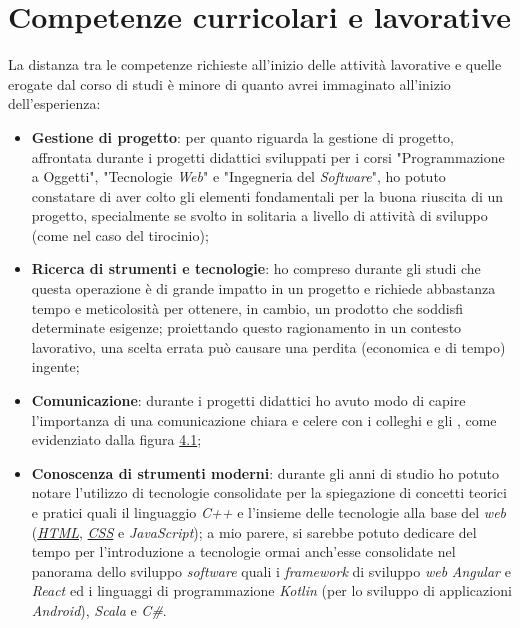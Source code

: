 \section{Competenze curricolari e lavorative}
La distanza tra le competenze richieste all'inizio delle attività lavorative e quelle erogate dal corso di studi è minore di quanto avrei immaginato all'inizio dell'esperienza: 
\begin{itemize}
    \item \textbf{Gestione di progetto}: per quanto riguarda la gestione di progetto, affrontata durante i progetti didattici sviluppati per i corsi "Programmazione a Oggetti", "Tecnologie \textit{Web}" e "Ingegneria del \textit{Software}", 
            ho potuto constatare di aver colto gli elementi fondamentali per la buona riuscita di un progetto, specialmente se svolto in solitaria a livello di attività di sviluppo (come nel caso del tirocinio);
    \item \textbf{Ricerca di strumenti e tecnologie}: ho compreso durante gli studi che questa operazione è di grande impatto in un progetto e richiede abbastanza tempo e meticolosità per ottenere, in cambio, un prodotto che soddisfi determinate esigenze; proiettando questo ragionamento in un
            contesto lavorativo, una scelta errata può causare una perdita (economica e di tempo) ingente;
    \item \textbf{Comunicazione}: durante i progetti didattici ho avuto modo di capire l'importanza di una comunicazione chiara e celere con i colleghi e gli , come evidenziato dalla figura \hyperref[fig:req]{4.1};
    \item \textbf{Conoscenza di strumenti moderni}: durante gli anni di studio ho potuto notare l'utilizzo di tecnologie consolidate per la spiegazione di concetti teorici e pratici quali il linguaggio \textit{C++} e l'insieme delle tecnologie alla base del \textit{web} (\hyperref[subsubsec:html]{\textit{HTML}}, \hyperref[subsubsec:css]{\textit{CSS}} e \textit{JavaScript});
            a mio parere, si sarebbe potuto dedicare del tempo per l'introduzione a tecnologie ormai anch'esse consolidate nel panorama dello sviluppo \textit{software} quali i \textit{framework} di sviluppo \textit{web} \textit{Angular} e \textit{React} ed i linguaggi di programmazione \textit{Kotlin} (per lo sviluppo di applicazioni \textit{Android}), \textit{Scala} e \textit{C\#}.
\end{itemize}
